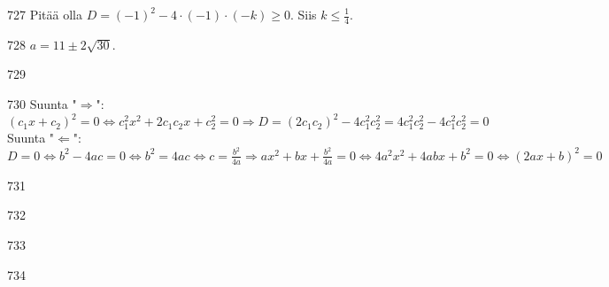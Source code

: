 \begin{Vastaus}{727}
		Pitää olla $D=(-1)^2-4 \cdot (-1) \cdot (-k) \geq 0$. Siis $k \leq \frac{1}{4}$.
	
\end{Vastaus}
\begin{Vastaus}{728}
		$a =11 \pm 2\sqrt{30}$.
	
\end{Vastaus}
\begin{Vastaus}{729}
	
\end{Vastaus}
\begin{Vastaus}{730}
		Suunta "$\Rightarrow$": $(c_1 x+ c_2)^2=0 \Leftrightarrow c_1^2 x^2 + 2c_1 c_2 x+ c_2^2 =0 \Rightarrow
		D=(2 c_1 c_2)^2-4 c_1^2 c_2^2 =4 c_1^2 c_2^2 -4 c_1^2 c_2^2 =0$ \\
		Suunta "$\Leftarrow$": $D=0 \Leftrightarrow b^2-4ac=0 \Leftrightarrow b^2=4ac \Leftrightarrow c=\frac{b^2}{4a} \Rightarrow ax^2+bx+\frac{b^2}{4a}=0 \Leftrightarrow 4a^2x^2+4abx+b^2=0 \Leftrightarrow (2ax+b)^2=0$
	
\end{Vastaus}
\begin{Vastaus}{731}
    
\end{Vastaus}
\begin{Vastaus}{732}
    
\end{Vastaus}
\begin{Vastaus}{733}
    
\end{Vastaus}
\begin{Vastaus}{734}
  
\end{Vastaus}
